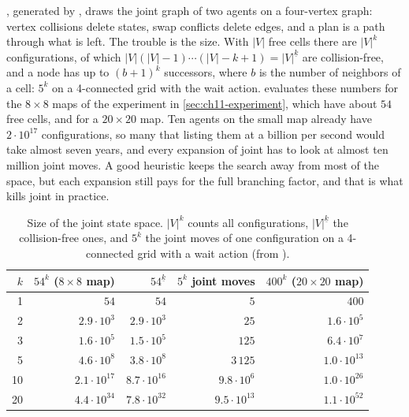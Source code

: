 , generated by ,
draws the joint graph of two agents on a four-vertex graph: vertex
collisions delete states, swap conflicts delete edges, and a plan is a path
through what is left. The trouble is the size. With $|V|$ free cells there
are $|V|^k$ configurations, of which $|V|(|V|-1)\cdots(|V|-k+1) =
|V|^{\underline{k}}$ are collision-free, and a node has up to $(b+1)^k$
successors, where $b$ is the number of neighbors of a cell: $5^k$ on a
4-connected grid with the wait action.  evaluates these
numbers for the $8 \times 8$ maps of the experiment in
\cref{sec:ch11-experiment}, which have about $54$ free cells, and for a
$20 \times 20$ map. Ten agents on the small map already have $2 \cdot
10^{17}$ configurations, so many that listing them at a billion per second
would take almost seven years, and every expansion of joint \astar has to
look at almost ten million joint moves. A good heuristic keeps the search
away from most of the space, but each expansion still pays for the full
branching factor, and that is what kills joint \astar in
practice.

\begin{table}[!tb]
  \centering\small
  \caption{Size of the joint state space. $|V|^k$ counts all configurations,
  $|V|^{\underline{k}}$ the collision-free ones, and $5^k$ the joint moves of
  one configuration on a 4-connected grid with a wait action (from
  ).}
  \label{tab:ch11-sizes}
  \begin{tabular}{@{}rrrrr@{}}
  \toprule
  $k$ & $54^k$ ($8\times 8$ map) & $54^{\underline{k}}$ & $5^k$ joint moves & $400^k$ ($20\times 20$ map)\\
  \midrule
   1 & $54$ & $54$ & $5$ & $400$\\
   2 & $2.9 \cdot 10^{3}$ & $2.9 \cdot 10^{3}$ & $25$ & $1.6 \cdot 10^{5}$\\
   3 & $1.6 \cdot 10^{5}$ & $1.5 \cdot 10^{5}$ & $125$ & $6.4 \cdot 10^{7}$\\
   5 & $4.6 \cdot 10^{8}$ & $3.8 \cdot 10^{8}$ & $3\,125$ & $1.0 \cdot 10^{13}$\\
  10 & $2.1 \cdot 10^{17}$ & $8.7 \cdot 10^{16}$ & $9.8 \cdot 10^{6}$ & $1.0 \cdot 10^{26}$\\
  20 & $4.4 \cdot 10^{34}$ & $7.8 \cdot 10^{32}$ & $9.5 \cdot 10^{13}$ & $1.1 \cdot 10^{52}$\\
  \bottomrule
  \end{tabular}
\end{table}

